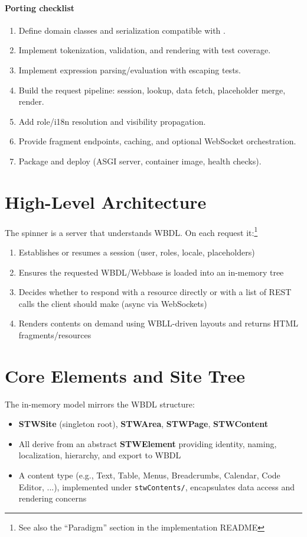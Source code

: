 \paragraph{Porting checklist}
\begin{enumerate}
	\item Define domain classes and serialization compatible with \wbdl.
	\item Implement \wbll tokenization, validation, and rendering with test coverage.
	\item Implement \wbpl expression parsing/evaluation with escaping tests.
	\item Build the request pipeline: session, lookup, data fetch, placeholder merge, render.
	\item Add role/i18n resolution and visibility propagation.
	\item Provide fragment endpoints, caching, and optional WebSocket orchestration.
	\item Package and deploy (ASGI server, container image, health checks).
\end{enumerate}

\section{High-Level Architecture}
The spinner is a server that understands WBDL. On each request it:\footnote{See also the ``Paradigm'' section in the implementation README}
\begin{enumerate}
	\item Establishes or resumes a session (user, roles, locale, placeholders)
	\item Ensures the requested WBDL/Webbase is loaded into an in-memory tree
	\item Decides whether to respond with a resource directly or with a list of REST calls the client should make (async via WebSockets)
	\item Renders contents on demand using WBLL-driven layouts and returns HTML fragments/resources
\end{enumerate}

\section{Core Elements and Site Tree}
The in-memory model mirrors the WBDL structure:
\begin{itemize}
	\item \textbf{STWSite} (singleton root), \textbf{STWArea}, \textbf{STWPage}, \textbf{STWContent}
	\item All derive from an abstract \textbf{STWElement} providing identity, naming, localization, hierarchy, and export to WBDL
	\item A content type (e.g., Text, Table, Menus, Breadcrumbs, Calendar, Code Editor, ...), implemented under \texttt{stwContents/}, encapsulates data access and rendering concerns
\end{itemize}

